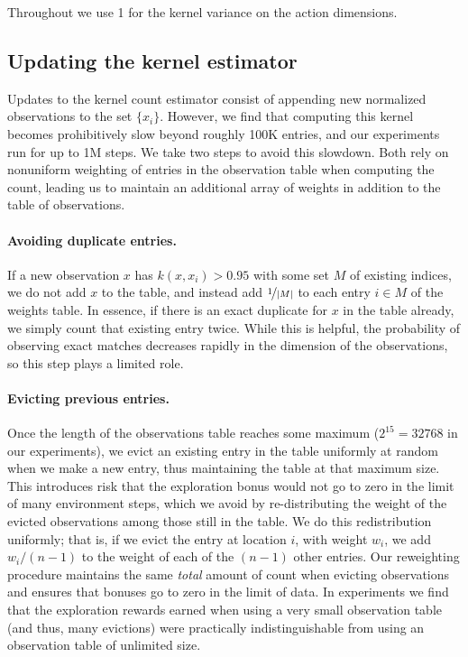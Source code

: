 \begin{subappendices}
Throughout we use 1 for the kernel variance on the action dimensions.

\subsection{Updating the kernel estimator}
Updates to the kernel count estimator consist of appending new normalized observations to the set $\{x_i\}$.
However, we find that computing this kernel becomes prohibitively slow beyond roughly 100K entries, and our experiments run for up to 1M steps.
We take two steps to avoid this slowdown.
Both rely on nonuniform weighting of entries in the observation table when computing the count, leading us to maintain an additional array of weights in addition to the table of observations.

\paragraph{Avoiding duplicate entries.}
If a new observation $x$ has $k(x, x_i) > 0.95$ with some set $M$ of existing indices, we do not add $x$ to the table, and instead add $\nicefrac{1}{|M|}$ to each entry $i \in M$ of the weights table.
In essence, if there is an exact duplicate for $x$ in the table already, we simply count that existing entry twice.
While this is helpful, the probability of observing exact matches decreases rapidly in the dimension of the observations, so this step plays a limited role.

\paragraph{Evicting previous entries.}
Once the length of the observations table reaches some maximum ($2^{15} = 32768$ in our experiments), we evict an existing entry in the table uniformly at random when we make a new entry, thus maintaining the table at that maximum size.
This introduces risk that the exploration bonus would not go to zero in the limit of many environment steps, which we avoid by re-distributing the weight of the evicted observations among those still in the table.
We do this redistribution uniformly; that is, if we evict the entry at location $i$, with weight $w_i$, we add $w_i / (n-1)$ to the weight of each of the $(n-1)$ other entries.
Our reweighting procedure maintains the same \emph{total} amount of count when evicting observations and ensures that bonuses go to zero in the limit of data.
In experiments we find that the exploration rewards earned when using a very small observation table (and thus, many evictions) were practically indistinguishable from using an observation table of unlimited size.



\end{subappendices}
